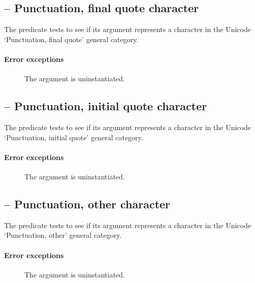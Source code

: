 \subsection{ -- Punctuation, final quote character}
\label{chars:isPfChar}

The  predicate tests to see if its  argument represents a character in the Unicode `Punctuation, final quote' general category. 
        
\paragraph{Error exceptions}
\begin{description}
\item[]
The argument is uninstantiated.
\end{description}

\subsection{ -- Punctuation, initial quote character}
\label{chars:isPiChar}

The  predicate tests to see if its  argument represents a character in the Unicode `Punctuation, initial quote' general category. 
        
\paragraph{Error exceptions}
\begin{description}
\item[]
The argument is uninstantiated.
\end{description}

\subsection{ -- Punctuation, other character}
\label{chars:isPoChar}

The  predicate tests to see if its  argument represents a character in the Unicode `Punctuation, other' general category. 
        
\paragraph{Error exceptions}
\begin{description}
\item[]
The argument is uninstantiated.
\end{description}

